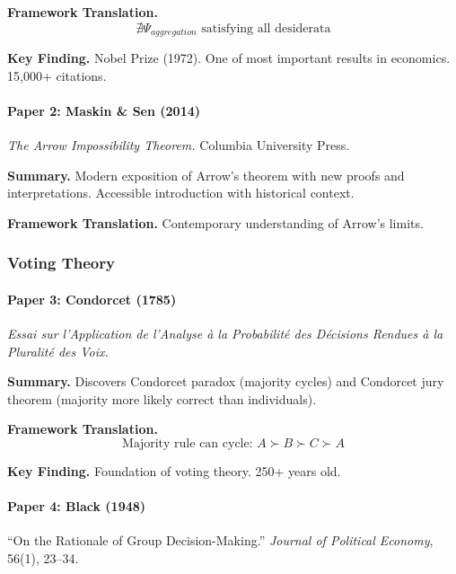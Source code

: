 \textbf{Framework Translation.}
\begin{equation}
\nexists \Psi_{aggregation} \text{ satisfying all desiderata}
\end{equation}

\textbf{Key Finding.}
Nobel Prize (1972). One of most important results in economics. 15,000+ citations.

\paragraph{Paper 2: Maskin \& Sen (2014)}

\textit{The Arrow Impossibility Theorem.}
Columbia University Press.

\textbf{Summary.}
Modern exposition of Arrow's theorem with new proofs and interpretations.
Accessible introduction with historical context.

\textbf{Framework Translation.}
Contemporary understanding of Arrow's limits.

\subsubsection{Voting Theory}

\paragraph{Paper 3: Condorcet (1785)}

\textit{Essai sur l'Application de l'Analyse à la Probabilité des Décisions 
Rendues à la Pluralité des Voix.}

\textbf{Summary.}
Discovers Condorcet paradox (majority cycles) and Condorcet jury theorem 
(majority more likely correct than individuals).

\textbf{Framework Translation.}
\begin{equation}
\text{Majority rule can cycle: } A \succ B \succ C \succ A
\end{equation}

\textbf{Key Finding.}
Foundation of voting theory. 250+ years old.

\paragraph{Paper 4: Black (1948)}

``On the Rationale of Group Decision-Making.''
\textit{Journal of Political Economy}, 56(1), 23--34.


